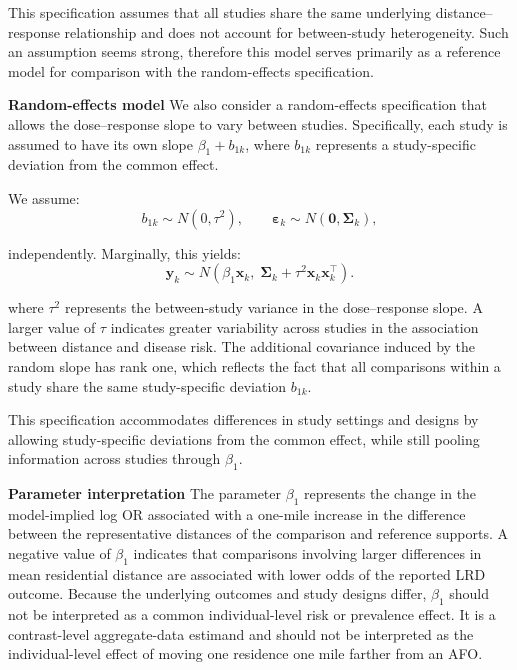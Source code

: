 \documentclass[journal=rsm]{CUP-JNL-DTM}%
\theoremstyle{definition}
\numberwithin{equation}{section}
\begin{document}
This specification assumes that all studies share the same underlying distance–response relationship and does not account for between-study heterogeneity. Such an assumption seems strong, therefore this model serves primarily as a reference model for comparison with the random-effects specification.

\noindent\textbf{Random-effects model} 
We also consider a random-effects specification that allows the dose–response slope to vary between studies. Specifically, each study is assumed to have its own slope $\beta_1 + b_{1k}$, where $b_{1k}$ represents a study-specific deviation from the common effect.
 
We assume:
\[
  b_{1k} \sim N(0, \tau^2),
  \qquad
  \boldsymbol{\varepsilon}_k \sim N(\mathbf{0}, \boldsymbol{\Sigma}_k),
\]

independently. Marginally, this yields:
%
\begin{equation}
  \mathbf{y}_k \sim N\!\left(
    \beta_1 \mathbf{x}_k,\;
    \boldsymbol{\Sigma}_k + \tau^2 \mathbf{x}_k \mathbf{x}_k^\top
  \right).
  \label{eq:marginal_re}
\end{equation}
 
where $\tau^2$ represents the between-study variance in the dose–response slope. A larger value of $\tau$ indicates greater variability across studies in the association between distance and disease risk. The additional covariance induced by the random slope has rank one, which
reflects the fact that all comparisons within a study share the same
study-specific deviation $b_{1k}$.

This specification accommodates differences in study settings and designs by allowing study-specific deviations from the common effect, while still pooling information across studies through $\beta_1$.
 
\noindent\textbf{Parameter interpretation} \label{sec:interpretation}
The parameter $\beta_1$ represents the change in the model-implied log OR
associated with a one-mile increase in the difference between the representative
distances of the comparison and reference supports. A negative value of $\beta_1$ indicates that
comparisons involving larger differences in mean residential distance are associated with
lower odds of the reported LRD outcome. Because the underlying outcomes and
study designs differ, $\beta_1$ should not be interpreted as a common
individual-level risk or prevalence effect. It is a contrast-level aggregate-data estimand and should not be
interpreted as the individual-level effect of moving one residence one mile
farther from an AFO.
\end{document}
